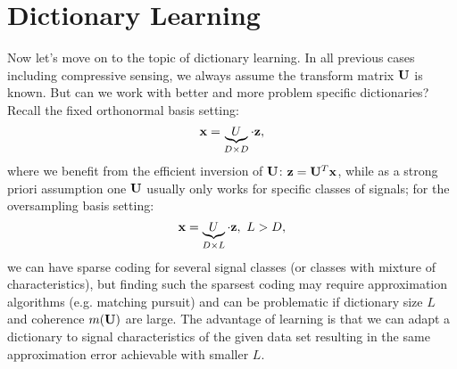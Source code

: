 \documentclass[../main.tex]{subfiles}
\begin{document}
\section{Dictionary Learning}
Now let's move on to the topic of dictionary learning. In all previous cases including compressive sensing, we always assume the transform matrix ${\bf U}$ is known. But can we work with better and more problem specific dictionaries? Recall the fixed orthonormal basis setting:
\begin{equation*}
{\bf x} = \underbrace{U}_{D\times D}\cdot {\bf z},
\end{equation*}
where we benefit from the efficient inversion of ${\bf U}$: ${\bf z} = {\bf U}^T{\bf x}$, while as a strong priori assumption one ${\bf U}$ usually only works for specific classes of signals; for the oversampling basis setting:
\begin{equation*}
{\bf x} = \underbrace{U}_{D\times L}\cdot {\bf z},\ L>D,
\end{equation*}
we can have sparse coding for several signal classes (or classes with mixture of characteristics), but finding such the sparsest coding may require approximation algorithms (e.g. matching pursuit) and can be problematic if dictionary size $L$ and coherence $m(\bf U)$ are large. The advantage of learning is that we can adapt a dictionary to signal characteristics of the given data set resulting in the same approximation error achievable with smaller $L$.
\end{document}
